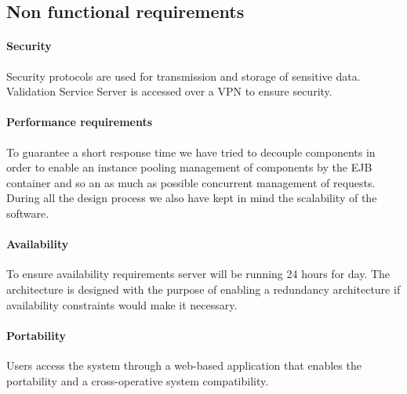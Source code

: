         \clearpage
        
    \subsection{Non functional requirements}
        \paragraph{Security}
        Security protocols are used for transmission and storage of sensitive data.
        Validation Service Server is accessed over a VPN to ensure security.

        \paragraph{Performance requirements}
        To guarantee a short response time we have tried to decouple components in order to enable an instance pooling management of components by the EJB container and so an as much as possible concurrent management of requests.
        During all the design process we also have kept in mind the scalability of the software.

        \paragraph{Availability}
        To ensure availability requirements server will be running 24 hours for day. The architecture is designed with the purpose of enabling a redundancy architecture if availability constraints would make it necessary.

        \paragraph{Portability}
        Users access the system through a web-based application that enables the portability and a cross-operative system compatibility.
 